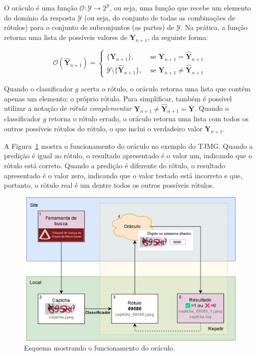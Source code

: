 \documentclass[12pt,twoside,brazilian]{book}
\begin{document}
O oráculo é uma função
\(\mathcal O: \mathcal Y \rightarrow 2^{\mathcal Y}\), ou seja, uma
função que recebe um elemento do domínio da resposta \(\mathcal Y\) (ou
seja, do conjunto de todas as combinações de rótulos) para o conjunto de
subconjuntos (as partes) de \(\mathcal Y\). Na prática, a função retorna
uma lista de possíveis valores de \({\mathbf Y}_{n+1}\), da seguinte
forma:

\[
\mathcal O(\hat {\mathbf Y}_{n+1}) = \left\{\begin{array}{ll}
    \{\mathbf Y_{n+1}\}, & \text{ se } \mathbf Y_{n+1} = \hat {\mathbf Y}_{n+1}  \\
    \mathcal Y \setminus \{\hat {\mathbf Y}_{n+1}\}, & \text{ se } \mathbf Y_{n+1} \neq \hat {\mathbf Y}_{n+1}
\end{array}\right.
\]

Quando o classificador \(g\) acerta o rótulo, o oráculo retorna uma
lista que contém apenas um elemento: o próprio rótulo. Para simplificar,
também é possível utilizar a notação de \emph{rótulo complementar}
\(\mathbf Y_{n+1} \neq \hat {\mathbf Y}_{n+1} = \bar{\mathbf Y}\).
Quando o classificador \(g\) retorna o rótulo errado, o oráculo retorna
uma lista com todos os outros possíveis rótulos do rótulo, o que inclui
o verdadeiro valor \(\mathbf Y_{n+1}\).

A Figura~\ref{fig-esquema-oraculo} mostra o funcionamento do oráculo no
exemplo do TJMG. Quando a predição é igual ao rótulo, o resultado
apresentado é o valor um, indicando que o rótulo está correto. Quando a
predição é diferente do rótulo, o resultado apresentado é o valor zero,
indicando que o valor testado está incorreto e que, portanto, o rótulo
real é um dentre todos os outros possíveis rótulos.

\begin{figure}

{\centering \includegraphics{./assets/img/esquema-oraculo.png}

}

\caption{\label{fig-esquema-oraculo}Esquema mostrando o funcionamento do
oráculo.}

\end{figure}
\end{document}
